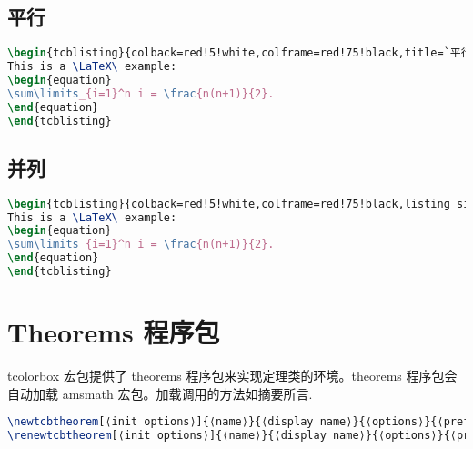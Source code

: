 \documentclass{ctexart}
\begin{document}
\subsection{平行}
\begin{lstlisting}[language={TeX}]
\begin{tcblisting}{colback=red!5!white,colframe=red!75!black,title=`平行展示`,fonttitle=\bfseries}
This is a \LaTeX\ example:
\begin{equation}
\sum\limits_{i=1}^n i = \frac{n(n+1)}{2}.
\end{equation}
\end{tcblisting}
\end{lstlisting}

\subsection{并列}
\begin{lstlisting}[language={TeX}]
\begin{tcblisting}{colback=red!5!white,colframe=red!75!black,listing side text,title=`并列展示`,fonttitle=\bfseries}
This is a \LaTeX\ example:
\begin{equation}
\sum\limits_{i=1}^n i = \frac{n(n+1)}{2}.
\end{equation}
\end{tcblisting}
\end{lstlisting}
\section{Theorems 程序包}
tcolorbox 宏包提供了 theorems 程序包来实现定理类的环境。theorems 程序包会自动加载 amsmath 宏包。加载调用的方法如摘要所言.
\begin{lstlisting}[language={TeX}]
\newtcbtheorem[⟨init options⟩]{⟨name⟩}{⟨display name⟩}{⟨options⟩}{⟨prefix⟩}
\renewtcbtheorem[⟨init options⟩]{⟨name⟩}{⟨display name⟩}{⟨options⟩}{⟨prefix⟩}
\end{lstlisting}
\end{document}

